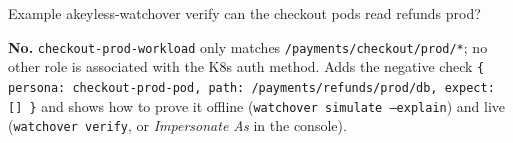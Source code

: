 \begin{session}{Example}
\you akeyless-watchover verify can the checkout pods read refunds prod?

\agent \textbf{No.} \texttt{checkout-prod-workload} only matches \texttt{/payments/checkout/prod/*}; no
other role is associated with the K8s auth method. Adds the negative check
\texttt{\{ persona: checkout-prod-pod, path: /payments/refunds/prod/db, expect: [] \}} and shows how
to prove it offline (\texttt{watchover simulate --explain}) and live (\texttt{watchover verify}, or
\emph{Impersonate As} in the console).
\end{session}
